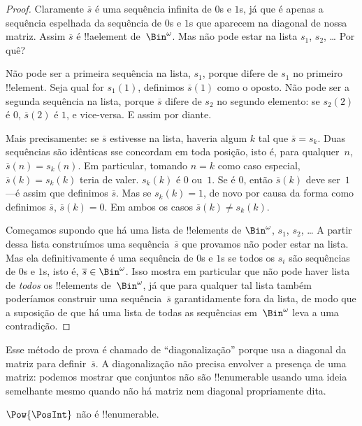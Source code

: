 \documentclass[../../../include/open-logic-section]{subfiles}
\begin{document}
\begin{proof}
Claramente $\overline{s}$ é uma sequência infinita de $0$s e
$1$s, já que é apenas a sequência espelhada da sequência de $0$s
e $1$s que aparecem na diagonal de nossa matriz. Assim $\overline{s}$
é !!a{element} de~$\Bin^\omega$. Mas não pode estar na lista $s_1$,
$s_2$, \dots{} Por quê?

Não pode ser a primeira sequência na lista, $s_1$, porque difere de
$s_1$ no primeiro !!{element}. Seja qual for $s_1(1)$, definimos
$\overline{s}(1)$ como o oposto. Não pode ser a segunda
sequência na lista, porque $\overline{s}$ difere de $s_2$ no segundo
elemento: se $s_2(2)$ é $0$, $\overline{s}(2)$ é $1$, e vice-versa. E assim por diante.

Mais precisamente: se $\overline{s}$ estivesse na lista, haveria
algum $k$ tal que $\overline{s} = s_{k}$. Duas sequências são idênticas
sse concordam em toda posição, isto é, para qualquer~$n$, $\overline{s}(n) =
s_{k}(n)$. Em particular, tomando $n = k$ como caso especial,
$\overline{s}(k) = s_{k}(k)$ teria de valer. $s_k(k)$ é $0$
ou~$1$. Se é $0$, então $\overline{s}(k)$ deve ser~$1$---é assim
que definimos $\overline{s}$. Mas se $s_k(k) = 1$, de novo por causa
da forma como definimos $\overline{s}$, $\overline{s}(k) = 0$. Em ambos
os casos $\overline{s}(k) \neq s_{k}(k)$.

Começamos supondo que há uma lista de !!{element}s de
$\Bin^\omega$, $s_1$, $s_2$, \dots{} A partir dessa lista construímos uma
sequência~$\overline{s}$ que provamos não poder estar na lista. Mas ela
definitivamente é uma sequência de $0$s e $1$s se todos os $s_i$ são
sequências de $0$s e $1$s, isto é, $\overline{s} \in
\Bin^\omega$. Isso mostra em particular que não pode haver lista de
\emph{todos} os !!{element}s de~$\Bin^\omega$, já que para qualquer tal lista
também poderíamos construir uma sequência~$\overline{s}$ garantidamente fora
da lista, de modo que a suposição de que há uma lista de todas as sequências
em~$\Bin^\omega$ leva a uma contradição.
\end{proof}

\begin{explain}
Esse método de prova é chamado de ``diagonalização'' porque usa a
diagonal da matriz para definir~$\overline{s}$. A diagonalização não
precisa envolver a presença de uma matriz: podemos mostrar que conjuntos não são
!!{enumerable} usando uma ideia semelhante mesmo quando não há matriz nem
diagonal propriamente dita.
\end{explain}

\begin{thm}
$\Pow{\PosInt}$ não é !!{enumerable}.
\end{thm}
\end{document}
